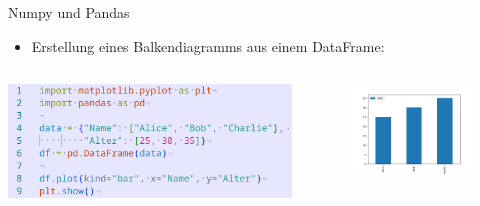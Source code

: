 \documentclass[aspectratio=169]{beamer}
\begin{document}
\begin{frame}{Numpy und Pandas}
    \begin{itemize}
        \item Erstellung eines Balkendiagramms aus einem DataFrame:
    \end{itemize}
    \begin{columns}
        \begin{column}{0.5\textwidth}
            \begin{tcolorbox}[colframe=oxfordblue, colback=blue!10, coltitle=white, title=Python]
            \includegraphics[width=1\textwidth]{images/code_matplotlibpandas.png}
        \end{tcolorbox}
        \end{column}
        \begin{column}{0.5\textwidth}
            \begin{figure}
                \centering
                \includegraphics[width=1\linewidth]{images/graph_matplotlibpandas.png}
            \end{figure}
        \end{column}
    \end{columns}
    
\end{frame}
\end{document}

